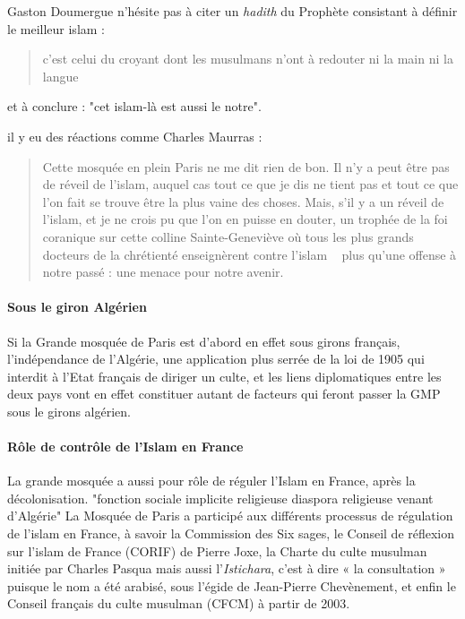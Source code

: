 Gaston Doumergue n'hésite pas à citer un \emph{hadith} du Prophète consistant à définir le meilleur islam : 
\begin{quote}
    c'est celui du croyant dont les musulmans n'ont à redouter ni la main ni la langue
\end{quote}
et à conclure : "cet islam-là est aussi le notre".


il y eu des réactions comme Charles Maurras : 
\begin{quote}
    Cette mosquée en plein Paris ne me dit rien de
bon. Il n'y a peut être pas de réveil de l'islam, auquel cas tout ce
que je dis ne tient pas et tout ce que l'on fait se trouve être la plus vaine des choses. Mais, s'il y a un réveil de l'islam, et je ne
crois pu que l'on en puisse en douter, un trophée de la foi coranique sur cette colline Sainte-Geneviève où tous les plus grands docteurs
de la chrétienté enseignèrent contre l'islam ~ plus
qu'une offense à notre passé : une menace pour notre avenir. 
\end{quote}

\paragraph{Sous le giron Algérien}
Si la Grande mosquée de Paris est d'abord en effet sous girons français, l'indépendance de l'Algérie, une application plus serrée de la loi de 1905 qui interdit à l'Etat français de diriger un culte, et les liens diplomatiques entre les deux pays vont en effet constituer autant de facteurs qui feront passer la GMP sous le girons algérien. 
\paragraph{Rôle de contrôle de l'Islam en France} La grande mosquée a aussi pour rôle de réguler l'Islam en France, après la décolonisation. "fonction sociale implicite religieuse diaspora religieuse venant d'Algérie" 
La Mosquée de Paris a participé aux différents
processus de régulation de l’islam en France, à
savoir la Commission des Six sages, le Conseil
de réflexion sur l’islam de France (CORIF) de
Pierre Joxe, la Charte du culte musulman initiée
par Charles Pasqua mais aussi l’\emph{Istichara}, c’est à
dire « la consultation » puisque le nom a été
arabisé, sous l’égide de Jean-Pierre
Chevènement, et enfin le Conseil français du
culte musulman (CFCM) à partir de 2003.
